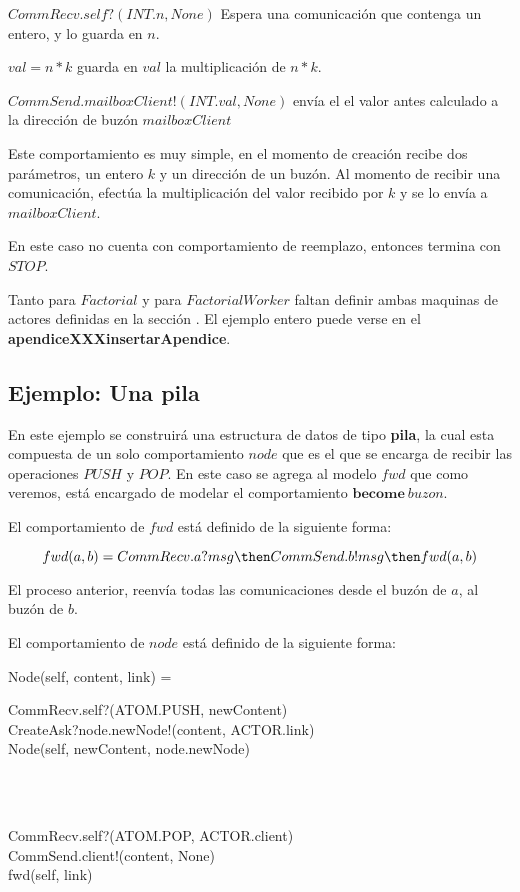 \begin{description}
 \item $CommRecv.self?(INT.n, None)$ Espera una comunicación que contenga un entero, y lo guarda en $n$.
 \item $val = n * k$ guarda en $val$ la multiplicación de $n * k$.
 \item $CommSend.mailboxClient!(INT.val, None)$ envía el el valor antes calculado a la dirección de buzón $mailboxClient$
\end{description}

Este comportamiento es muy simple, en el momento de creación recibe dos parámetros, un entero $k$ y un dirección de un buzón. Al momento de recibir una comunicación, efectúa la multiplicación del valor recibido por $k$ y se lo envía a $mailboxClient$.

En este caso no cuenta con comportamiento de reemplazo, entonces termina con $STOP$.

Tanto para $Factorial$ y para $FactorialWorker$ faltan definir ambas maquinas de actores definidas en la sección  \cite{modelo:crear}. El ejemplo entero puede verse en el \textbf{apendiceXXXinsertarApendice}.


\subsection{Ejemplo: Una pila}

En este ejemplo se construirá una estructura de datos de tipo \textbf{pila}, la cual esta compuesta de un solo comportamiento $node$ que es el que se encarga de recibir las operaciones $PUSH$ y $POP$. En este caso se agrega al modelo $fwd$ que como veremos, está encargado de modelar el comportamiento $\textbf{become}\ buzon$.

El comportamiento de $fwd$ está definido de la siguiente forma:

\[
  fwd(a, b) = CommRecv.a?msg \then CommSend.b!msg \then fwd(a, b)
\]

El proceso anterior, reenvía todas las comunicaciones desde el buzón de $a$, al buzón de $b$.

El comportamiento de $node$ está definido de la siguiente forma:

\begin{process}
Node(self, content, link) = {} \\ \quad
\begin{block}
CommRecv.self?(ATOM.PUSH, newContent) \then \\
CreateAsk?node.newNode!(content, ACTOR.link) \then \\
Node(self, newContent, node.newNode)
\end{block} \\
\Extchoice \\ \quad
\begin{block}
CommRecv.self?(ATOM.POP, ACTOR.client) \then  \\
CommSend.client!(content, None) \then  \\
fwd(self, link)
\end{block}

\end{process}

